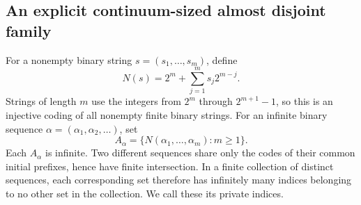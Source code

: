 \documentclass[11pt,a4paper]{article}
\numberwithin{equation}{section}
\theoremstyle{definition}
\theoremstyle{remark}
\begin{document}
\subsection{An explicit continuum-sized almost disjoint family}
For a nonempty binary string $s=(s_1,\ldots,s_m)$, define
\begin{equation}\label{tail:eq:binarycode}
 N(s)=2^m+\sum_{j=1}^m s_j2^{m-j}.
\end{equation}
Strings of length $m$ use the integers from $2^m$ through $2^{m+1}-1$,
so this is an injective coding of all nonempty finite binary strings.
For an infinite binary sequence $\alpha=(\alpha_1,\alpha_2,\ldots)$, set
\begin{equation}\label{tail:eq:Aalpha}
 A_\alpha=\{N(\alpha_1,\ldots,\alpha_m):m\geq1\}.
\end{equation}
Each $A_\alpha$ is infinite. Two different sequences share only the
codes of their common initial prefixes, hence have finite intersection.
In a finite collection of distinct sequences, each corresponding set
therefore has infinitely many indices belonging to no other set in the
collection. We call these its private indices.
\end{document}

